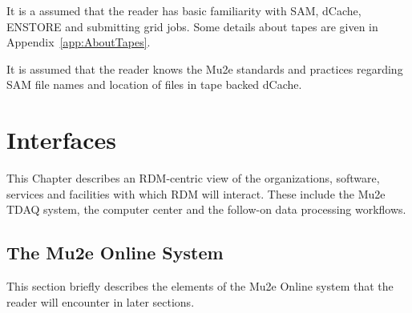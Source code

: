 It is a assumed that the reader has basic familiarity with SAM, dCache, ENSTORE and submitting grid jobs.
Some details about tapes are given in Appendix~\ref{app:AboutTapes}.

It is assumed that the reader knows the Mu2e standards and practices regarding SAM file names\cite{Mu2eSAM}
and location of files in tape backed dCache\cite{FileNames}.


\chapter{Interfaces}
\label{ch:SelectedDetails}
This Chapter describes an RDM-centric view of the organizations, software, services and facilities
with which RDM will interact.  These include the Mu2e TDAQ system,
the computer center and the follow-on data processing workflows.

\section{The Mu2e Online System}
\label{sec:Mu2eOnlineSystem}

This section briefly describes the elements of the Mu2e Online system that the reader will encounter in later sections.

